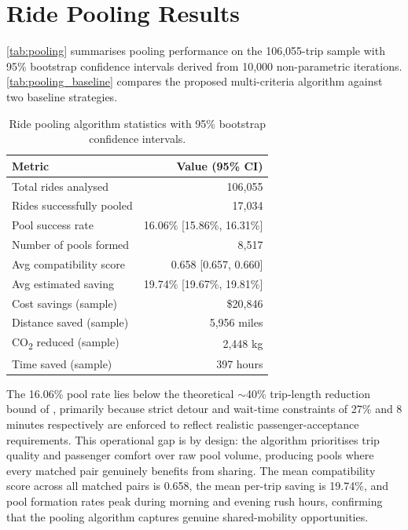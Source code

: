 \section{Ride Pooling Results}

\autoref{tab:pooling} summarises pooling performance on the 106,055-trip sample with 95\% bootstrap confidence intervals derived from 10,000 non-parametric iterations. \autoref{tab:pooling_baseline} compares the proposed multi-criteria algorithm against two baseline strategies.

\begin{table}[t]
\centering
\caption{Ride pooling algorithm statistics with 95\% bootstrap confidence intervals.\label{tab:pooling}}
\begin{tabularx}{\textwidth}{>{\raggedright\arraybackslash}X r}
\toprule
\textbf{Metric} & \textbf{Value (95\% CI)} \\
\midrule
Total rides analysed & 106,055 \\
Rides successfully pooled & 17,034 \\
Pool success rate & 16.06\% [15.86\%, 16.31\%] \\
Number of pools formed & 8,517 \\
Avg compatibility score & 0.658 [0.657, 0.660] \\
Avg estimated saving & 19.74\% [19.67\%, 19.81\%] \\
Cost savings (sample) & \$20,846 \\
Distance saved (sample) & 5,956 miles \\
CO\textsubscript{2} reduced (sample) & 2,448 kg \\
Time saved (sample) & 397 hours \\
\bottomrule
\end{tabularx}
\end{table}

The 16.06\% pool rate lies below the theoretical $\sim$40\% trip-length reduction bound of \parencite{santi2014quantifying}, primarily because strict detour and wait-time constraints of 27\% and 8 minutes respectively are enforced to reflect realistic passenger-acceptance requirements. This operational gap is by design: the algorithm prioritises trip quality and passenger comfort over raw pool volume, producing pools where every matched pair genuinely benefits from sharing. The mean compatibility score across all matched pairs is 0.658, the mean per-trip saving is 19.74\%, and pool formation rates peak during morning and evening rush hours, confirming that the pooling algorithm captures genuine shared-mobility opportunities.

